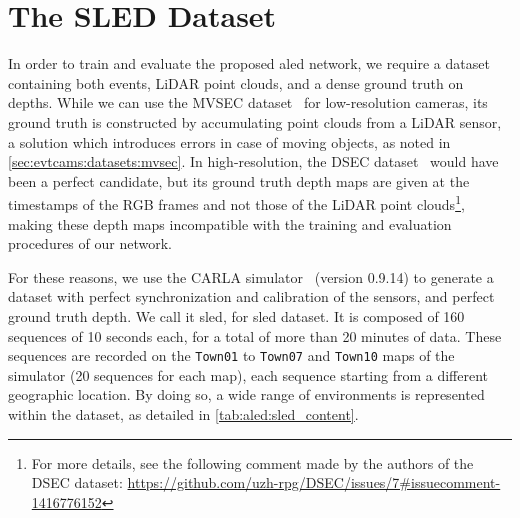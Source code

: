 \section{The SLED Dataset}\label{sec:aled:sled}
In order to train and evaluate the proposed \acrshort{aled} network, we require a dataset containing both events, LiDAR point clouds, and a dense ground truth on depths. While we can use the MVSEC dataset~\cite{Zhu2018TheMS} for low-resolution cameras, its ground truth is constructed by accumulating point clouds from a LiDAR sensor, a solution which introduces errors in case of moving objects, as noted in \cref{sec:evtcams:datasets:mvsec}. In high-resolution, the DSEC dataset~\cite{Gehrig2021DSECAS} would have been a perfect candidate, but its ground truth depth maps are given at the timestamps of the RGB frames and not those of the LiDAR point clouds\footnote{For more details, see the following comment made by the authors of the DSEC dataset: \url{https://github.com/uzh-rpg/DSEC/issues/7\#issuecomment-1416776152}}, making these depth maps incompatible with the training and evaluation procedures of our network.

For these reasons, we use the CARLA simulator~\cite{Dosovitskiy2017CARLAAO} (version 0.9.14) to generate a dataset with perfect synchronization and calibration of the sensors, and perfect ground truth depth. We call it \acrshort{sled}, for \acrlong{sled} dataset. It is composed of 160 sequences of 10 seconds each, for a total of more than 20 minutes of data. These sequences are recorded on the \verb|Town01| to \verb|Town07| and \verb|Town10| maps of the simulator (20 sequences for each map), each sequence starting from a different geographic location. By doing so, a wide range of environments is represented within the dataset, as detailed in \cref{tab:aled:sled_content}.

